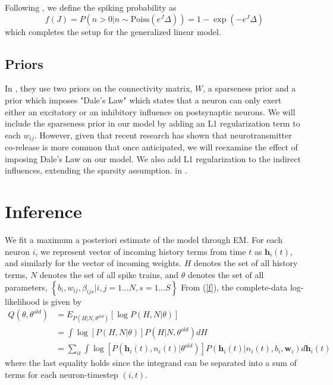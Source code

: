 \documentclass{article}
\begin{document}
Following \citep{mishchencko2011}, we define the spiking probability as 
\begin{equation} \label{f}
f(J) = P\left(n>0 | n \sim \text{Poiss}(e^J\Delta)\right) = 1 - \exp(-e^J\Delta)
\end{equation}
which completes the setup for the generalized linear model. 

\subsection{Priors}
In \citep{mishchencko2011}, they use two priors on the connectivity
matrix, $W$, a sparseness prior and a prior which imposes "Dale's
Law" which states that a neuron can only exert either an excitatory
or an inhibitory influence on postsynaptic neurons. We will include
the sparseness prior in our model by adding an L1 regularization
term to each $w_{ij}$. However, given that recent research has shown
that neurotransmitter co-release is more common that once anticipated,
we will reexamine the effect of imposing Dale's Law on our model.
We also add L1 regularization to the indirect influences, extending
the sparsity assumption.
in \citep{patnaik2011}.

\section{Inference}
We fit a maximum a posteriori estimate of the model through EM.  For
each neuron $i$, we represent vector of incoming history terms from
time $t$ as $\mathbf{h}_i(t)$, and similarly for the vector of
incoming weights. $H$ denotes the set of all history terms, $N$
denotes the set of all spike trains, and $\theta$ denotes the set
of all parameters,
$\left\{ b_i, w_{ij}, \beta_{ijs} | i,j = 1 \ldots N, s = 1 \ldots S \right\}$
From (\ref{f}), the complete-data log-likelihood is given by
\begin{align*} \label{Q}  
Q(\theta,\theta^{old}) &= E_{P(H|N,\theta^{old})} \left[ \log{P(H,N|\theta)} \right] 
\\                     &= \int{ \log\left[P(H,N|\theta)\right] P(H|N,\theta^{old}) dH }
\\                     &= \sum_{it} \int \log\left[P(\mathbf{h}_i(t),n_i(t)|\theta^{old})\right] P(\mathbf{h}_i(t)|n_i(t),b_i,\mathbf{w}_i) d\mathbf{h}_i(t)
\end{align*}
where the last equality holds since the integrand can be separated
into a sum of terms for each neuron-timestep $(i,t)$.
\end{document}

